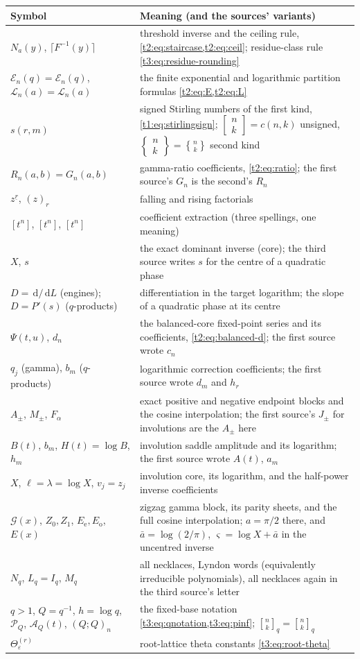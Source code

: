 \documentclass[11pt,openany]{book}
\numberwithin{equation}{chapter}
\theoremstyle{plain}
\theoremstyle{definition}
\theoremstyle{remark}
\newcommand{\dd}{\,\mathrm d}                 %
\newcommand{\coefA}[1]{\left[#1\right]}       %
\newcommand{\coefB}[2]{[#1^{#2}]}             %
\newcommand{\ExpC}{\mathcal E}\newcommand{\LogC}{\mathcal L}
\newcommand{\cE}{\mathcal E}\newcommand{\cL}{\mathcal L}
\newcommand{\fall}[2]{#1^{\underline{#2}}}
\newcommand{\rising}[2]{(#1)_{#2}}
\newcommand{\qbin}[3]{\genfrac{[}{]}{0pt}{}{#1}{#2}_{#3}}   %
\newcommand{\qbinq}[2]{\genfrac{[}{]}{0pt}{}{#1}{#2}_{q}}   %
\newcommand{\Sii}[2]{\genfrac{\{}{\}}{0pt}{}{#1}{#2}}
\newcommand{\StirII}[2]{\left\{\begin{matrix}#1\\#2\end{matrix}\right\}}
\newcommand{\StirI}[2]{\left[\begin{matrix}#1\\#2\end{matrix}\right]}
\newcommand{\sone}[2]{s(#1,#2)}
\newcommand{\pp}[1]{(Q;Q)_{#1}}
\newcommand{\Pinf}{\mathcal P_Q}
\newcommand{\A}{\mathcal A_Q}
\newcommand{\eps}{\varepsilon}
\newcommand{\T}{\Theta}
\begin{document}
\begin{center}
\small
\renewcommand{\arraystretch}{1.15}
\begin{tabularx}{\textwidth}{@{}p{}X@{}}
\toprule
Symbol & Meaning (and the sources' variants)\\
\midrule
$N_a(y)$, $\lceil F^{-1}(y)\rceil$ & threshold inverse and the ceiling rule, \cref{t2:eq:staircase,t2:eq:ceil}; residue-class rule \cref{t3:eq:residue-rounding}\\
$\cE_n(q)=\ExpC_n(q)$, $\cL_n(a)=\LogC_n(a)$ & the finite exponential and logarithmic partition formulas \cref{t2:eq:E,t2:eq:L}\\
$\sone{r}{m}$ & signed Stirling numbers of the first kind, \cref{t1:eq:stirlingsign}; $\StirI nk=c(n,k)$ unsigned, $\StirII nk=\Sii nk$ second kind\\
$R_n(a,b)=G_n(a,b)$ & gamma-ratio coefficients, \cref{t2:eq:ratio}; the first source's $G_n$ is the second's $R_n$\\
$\fall{z}{r}$, $\rising{z}{r}$ & falling and rising factorials\\
$\coefA{t^n}$, $\coefB{t}{n}$, $[t^n]$ & coefficient extraction (three spellings, one meaning)\\
$X$, $s$ & the exact dominant inverse (core); the third source writes $s$ for the centre of a quadratic phase\\
$D=\dd/\dd L$ (engines); $D=P'(s)$ ($q$-products) & differentiation in the target logarithm; the slope of a quadratic phase at its centre\\
$\Psi(t,u)$, $d_n$ & the balanced-core fixed-point series and its coefficients, \cref{t2:eq:balanced-d}; the first source wrote $c_n$\\
$q_j$ (gamma), $b_m$ ($q$-products) & logarithmic correction coefficients; the first source wrote $d_m$ and $h_r$\\
$A_\pm$, $M_\pm$, $F_\alpha$ & exact positive and negative endpoint blocks and the cosine interpolation; the first source's $J_\pm$ for involutions are the $A_\pm$ here\\
$B(t)$, $b_m$, $H(t)=\log B$, $h_m$ & involution saddle amplitude and its logarithm; the first source wrote $A(t)$, $a_m$\\
$X$, $\ell=\lambda=\log X$, $v_j=z_j$ & involution core, its logarithm, and the half-power inverse coefficients\\
$\mathcal G(x)$, $Z_0,Z_1$, $E_{\mathrm e},E_{\mathrm o}$, $E(x)$ & zigzag gamma block, its parity sheets, and the full cosine interpolation; $a=\pi/2$ there, and $\bar a=\log(2/\pi)$, $\varsigma=\log X+\bar a$ in the uncentred inverse\\
$N_q$, $L_q=I_q$, $M_q$ & all necklaces, Lyndon words (equivalently irreducible polynomials), all necklaces again in the third source's letter\\
$q>1$, $Q=q^{-1}$, $h=\log q$, $\Pinf$, $\A(t)$, $\pp{n}$ & the fixed-base notation \cref{t3:eq:qnotation,t3:eq:pinf}; $\qbin{n}{k}{q}=\qbinq{n}{k}$\\
$\T^{(r)}_\eps$ & root-lattice theta constants \cref{t3:eq:root-theta}\\
\bottomrule
\end{tabularx}
\end{center}
\end{document}
